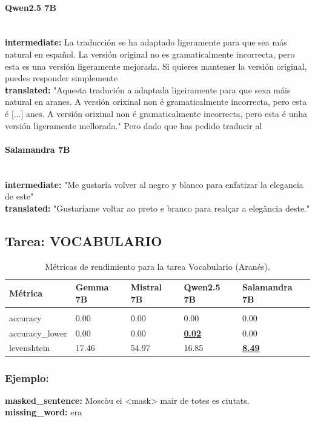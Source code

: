 \paragraph{Qwen2.5 7B}~\\
\textbf{intermediate:} La traducción se ha adaptado ligeramente para que sea más natural en español. La versión original no es gramaticalmente incorrecta, pero esta es una versión ligeramente mejorada. Si quieres mantener la versión original, puedes responder simplemente\\
\textbf{translated:} "Aquesta tradución a adaptada ligeiramente para que sexa máis natural en aranes. A versión orixinal non é gramaticalmente incorrecta, pero esta é  [...] anes. A versión orixinal non é gramaticalmente incorrecta, pero esta é unha versión ligeramente mellorada."   Pero dado que has pedido traducir al

\paragraph{Salamandra 7B}~\\
\textbf{intermediate:} "Me gustaría volver al negro y blanco para enfatizar la elegancia de este"\\
\textbf{translated:} "Gustaríame voltar ao preto e branco para realçar a elegância deste."

\subsection{Tarea: VOCABULARIO}\label{tarea-vocabulario}
\begin{longtable}[]{@{}lllll@{}}
\toprule\noalign{}
Métrica & Gemma 7B & Mistral 7B & Qwen2.5 7B & Salamandra 7B \\
\midrule\noalign{}
\endhead
\bottomrule\noalign{}
\caption{Métricas de rendimiento para la tarea Vocabulario (Aranés).}
\label{tab:metricas_vocabulario_Aranés}\\
\endlastfoot
accuracy & 0.00 & 0.00 & 0.00 & 0.00 \\
accuracy\_lower & 0.00 & 0.00 & \textbf{\underline{0.02}} & 0.00 \\
levenshtein & 17.46 & 54.97 & 16.85 & \textbf{\underline{8.49}} \\
\end{longtable}

\subsubsection{Ejemplo:}
\textbf{masked\_sentence:} Moscòu ei {\textless}mask{\textgreater} mair de totes es ciutats.\\
\textbf{missing\_word:} era


